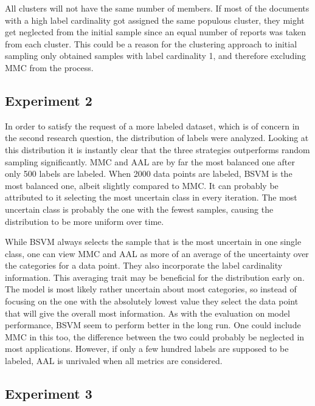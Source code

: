 All clusters will not have the same number of members.
If most of the documents with a high label cardinality got assigned the same populous cluster, they might get neglected from the initial sample since an equal number of reports was taken from each cluster.
This could be a reason for the clustering approach to initial sampling only obtained samples with label cardinality 1, and therefore excluding MMC from the process.

\subsection{Experiment 2}

In order to satisfy the request of a more labeled dataset, which is of concern in the second research question, the distribution of labels were analyzed.
Looking at this distribution it is instantly clear that the three strategies outperforms random sampling significantly.
MMC and AAL are by far the most balanced one after only 500 labels are labeled.
When 2000 data points are labeled, BSVM is the most balanced one, albeit slightly compared to MMC.
It can probably be attributed to it selecting the most uncertain class in every iteration.
The most uncertain class is probably the one with the fewest samples, causing the distribution to be more uniform over time.

While BSVM always selects the sample that is the most uncertain in one single class, one can view MMC and AAL as more of an average of the uncertainty over the categories for a data point.
They also incorporate the label cardinality information.
This averaging trait may be beneficial for the distribution early on.
The model is most likely rather uncertain about most categories, so instead of focusing on the one with the absolutely lowest value they select the data point that will give the overall most information.
As with the evaluation on model performance, BSVM seem to perform better in the long run.
One could include MMC in this too, the difference between the two could probably be neglected in most applications.
However, if only a few hundred labels are supposed to be labeled, AAL is unrivaled when all metrics are considered.

\subsection{Experiment 3}

